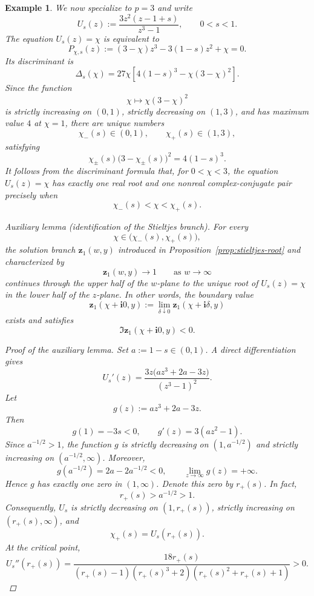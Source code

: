 \documentclass[11pt]{amsart}
\theoremstyle{plain}
\newtheorem{example}[theorem]{Example}
\numberwithin{equation}{section}
\numberwithin{theorem}{section}
\numberwithin{figure}{section}
\begin{document}
\begin{example}
We now specialize to $p=3$ and write
\[
    U_s(z)
    :=
    \frac{3z^2(z-1+s)}{z^3-1},
    \qquad 0<s<1.
\]
The equation $U_s(z)=\chi$ is equivalent to
\begin{equation}
    P_{\chi,s}(z)
    :=
    (3-\chi)z^3
    -3(1-s)z^2
    +\chi
    =0.
\end{equation}
Its discriminant is
\begin{equation}
    \Delta_s(\chi)
    =
    27\chi
    \left[
        4(1-s)^3
        -\chi(3-\chi)^2
    \right].
\end{equation}
Since the function
\[
    \chi\longmapsto \chi(3-\chi)^2
\]
is strictly increasing on $(0,1)$, strictly decreasing on $(1,3)$,
and has maximum value $4$ at $\chi=1$, there are unique numbers
\[
    \chi_-(s)\in(0,1),
    \qquad
    \chi_+(s)\in(1,3),
\]
satisfying
\begin{equation}
    \chi_\pm(s)\bigl(3-\chi_\pm(s)\bigr)^2
    =
    4(1-s)^3.
\end{equation}
It follows from the discriminant formula that, for $0<\chi<3$, the
equation $U_s(z)=\chi$ has exactly one real root and one nonreal
complex-conjugate pair precisely when
\[
    \chi_-(s)<\chi<\chi_+(s).
\]

\medskip
\noindent\textit{Auxiliary lemma (identification of the Stieltjes branch).}
For every
\[
    \chi\in\bigl(\chi_-(s),\chi_+(s)\bigr),
\]
the solution branch $\mathbf z_1(w,y)$ introduced in
Proposition~\ref{prop:stieltjes-root} and characterized by
\[
    \mathbf z_1(w,y)\longrightarrow1
    \qquad\text{as }w\longrightarrow\infty
\]
continues through the upper half of the $w$-plane to the unique root of
$U_s(z)=\chi$ in the lower half of the $z$-plane. In other words, the
boundary value
\[
    \mathbf z_1(\chi+\mathbf i0,y)
    :=
    \lim_{\delta\downarrow0}
    \mathbf z_1(\chi+\mathbf i\delta,y)
\]
exists and satisfies
\[
    \Im\mathbf z_1(\chi+\mathbf i0,y)<0.
\]

\begin{proof}[Proof of the auxiliary lemma]
Set $a:=1-s\in(0,1)$. A direct differentiation gives
\begin{equation}
    U_s'(z)
    =
    \frac{3z\bigl(az^3+2a-3z\bigr)}{(z^3-1)^2}.
\end{equation}
Let
\[
    g(z):=az^3+2a-3z.
\]
Then
\[
    g(1)=-3s<0,
    \qquad
    g'(z)=3(az^2-1).
\]
Since $a^{-1/2}>1$, the function $g$ is strictly decreasing on
$(1,a^{-1/2})$ and strictly increasing on
$(a^{-1/2},\infty)$. Moreover,
\[
    g(a^{-1/2})=2a-2a^{-1/2}<0,
    \qquad
    \lim_{z\to\infty}g(z)=+\infty.
\]
Hence $g$ has exactly one zero in $(1,\infty)$. Denote this zero by
$r_+(s)$. In fact,
\[
    r_+(s)>a^{-1/2}>1.
\]
Consequently, $U_s$ is strictly decreasing on $(1,r_+(s))$, strictly
increasing on $(r_+(s),\infty)$, and
\[
    \chi_+(s)=U_s(r_+(s)).
\]
At the critical point,
\begin{equation}
    U_s''(r_+(s))
    =
    \frac{18r_+(s)}{
        (r_+(s)-1)(r_+(s)^3+2)(r_+(s)^2+r_+(s)+1)
    }
    >0.
\end{equation}


\end{proof}
\end{example}
\end{document}
